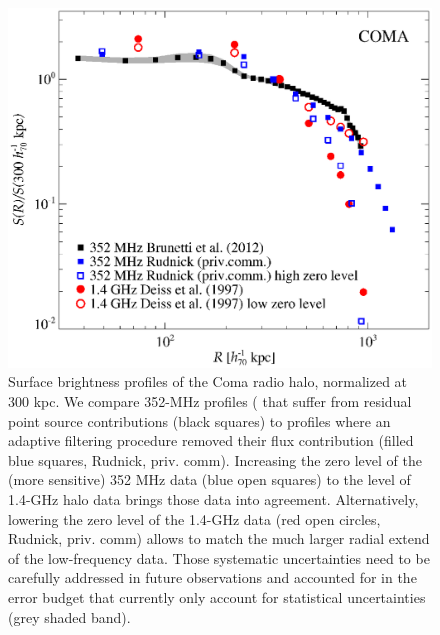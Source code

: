 \documentclass[useAMS,usenatbib]{mn2e}
\begin{document}
\begin{figure} 
\centering
\includegraphics[width=\columnwidth]{figures/SB_Coma_norm_band.eps}
\caption{Surface brightness profiles of the Coma radio halo, normalized at 300
  kpc. We compare 352-MHz profiles (\citep{2012arXiv1207.3025B} that suffer from
  residual point source contributions (black squares) to profiles where an
  adaptive filtering procedure removed their flux contribution (filled blue
  squares, Rudnick, priv. comm). Increasing the zero level of the (more
  sensitive) 352 MHz data (blue open squares) to the level of 1.4-GHz halo data
  \citep[red filled circles,][]{1997A&A...321...55D} brings those data into
  agreement. Alternatively, lowering the zero level of the 1.4-GHz data (red
  open circles, Rudnick, priv. comm) allows to match the much larger radial
  extend of the low-frequency data. Those systematic uncertainties need to be
  carefully addressed in future observations and accounted for in the error
  budget that currently only account for statistical uncertainties (grey shaded
  band).}
\label{fig:SB_Coma}
\end{figure}
\end{document}
